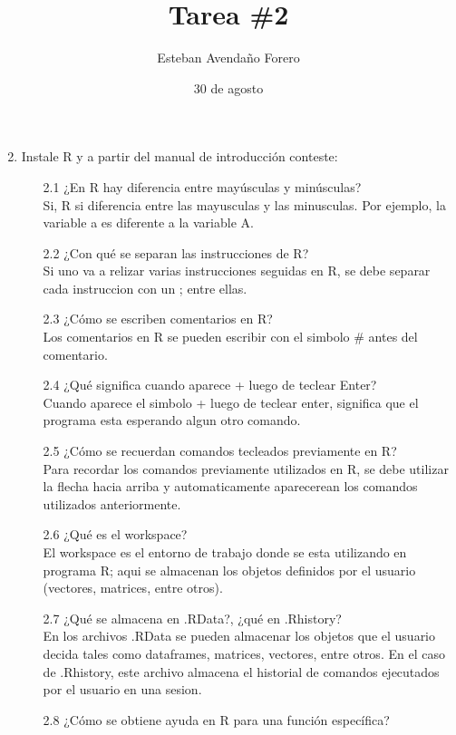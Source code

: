 \documentclass[letterpaper, 12pt]{article}
\title{Tarea \#2}
\author{Esteban Avendaño Forero}
\date{30 de agosto}
\begin{document}


\maketitle

\begin{enumerate}
\setcounter{enumi}{1}
\item Instale R y a partir del manual de introducción conteste:
\begin{enumerate}
\item[2.1] ¿En R hay diferencia entre mayúsculas y minúsculas?\\
Si, R si diferencia entre las mayusculas y las minusculas. Por ejemplo, la 
variable a es diferente a la variable A.
\item[2.2] ¿Con qué se separan las instrucciones de R?\\
Si uno va a relizar varias instrucciones seguidas en R, se debe separar cada 
instruccion con un ; entre ellas.
\item[2.3] ¿Cómo se escriben comentarios en R?\\
Los comentarios en R se pueden escribir con el simbolo \# antes del comentario.
\item[2.4] ¿Qué significa cuando aparece + luego de teclear Enter?\\
Cuando aparece el simbolo + luego de teclear enter, significa que el programa 
esta esperando algun otro comando.
\item[2.5] ¿Cómo se recuerdan comandos tecleados previamente en R?\\
Para recordar los comandos previamente utilizados en R, se debe utilizar la 
flecha hacia arriba y automaticamente aparecerean los comandos utilizados 
anteriormente.
\item[2.6] ¿Qué es el workspace?\\
El workspace es el entorno de trabajo donde se esta utilizando en programa R; 
aqui se almacenan los objetos definidos por el usuario (vectores, matrices, 
entre otros).
\item[2.7] ¿Qué se almacena en .RData?, ¿qué en .Rhistory?\\
En los archivos .RData se pueden almacenar los objetos que el usuario decida 
tales como dataframes, matrices, vectores, entre otros. En el caso de .Rhistory,
este archivo almacena el historial de comandos ejecutados por el usuario en una 
sesion.
\item[2.8] ¿Cómo se obtiene ayuda en R para una función específica?\\

\end{enumerate}
\end{enumerate}
\end{document}
